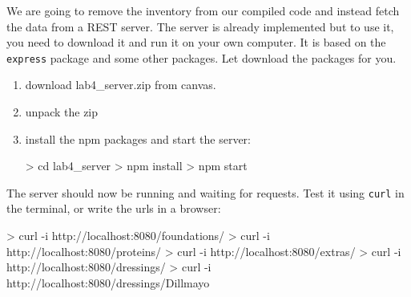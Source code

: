 \documentclass[fleqn, article, a4paper]{memoir}
\begin{document}
\begin{Assignments}

\item We are going to remove the inventory from our compiled code and instead fetch the data from a REST server. The server is already implemented but to use it, you need to download it and run it on your own computer. It is based on the \texttt{express} package and some other packages. Let  download the packages for you.
\begin{enumerate}
  \item download lab4\_server.zip from canvas.
  \item unpack the zip
  \item install the npm packages and start the server:
\begin{Code}
> cd lab4_server
> npm install
> npm start
\end{Code}
\end{enumerate}
The server should now be running and waiting for requests. Test it using \texttt{curl} in the terminal, or write the urls in a browser:
\begin{Code}
> curl -i http://localhost:8080/foundations/
> curl -i http://localhost:8080/proteins/
> curl -i http://localhost:8080/extras/
> curl -i http://localhost:8080/dressings/
> curl -i http://localhost:8080/dressings/Dillmayo
\end{Code}



\end{Assignments}
\end{document}
